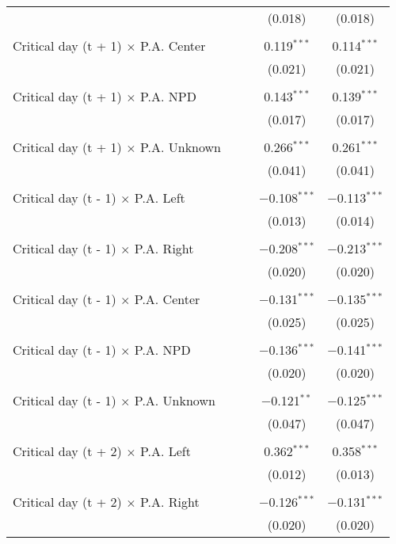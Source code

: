 \documentclass[
]{article}
\begin{document}
\begin{table}[!htbp]
{\begin{tabular}{@{\extracolsep{5pt}}lcccc}
  &  &  & (0.018) & (0.018) \\ 
  & & & & \\ 
 Critical day (t + 1) $\times$ P.A. Center &  &  & 0.119$^{***}$ & 0.114$^{***}$ \\ 
  &  &  & (0.021) & (0.021) \\ 
  & & & & \\ 
 Critical day (t + 1) $\times$ P.A. NPD &  &  & 0.143$^{***}$ & 0.139$^{***}$ \\ 
  &  &  & (0.017) & (0.017) \\ 
  & & & & \\ 
 Critical day (t + 1) $\times$ P.A. Unknown &  &  & 0.266$^{***}$ & 0.261$^{***}$ \\ 
  &  &  & (0.041) & (0.041) \\ 
  & & & & \\ 
 Critical day (t - 1) $\times$ P.A. Left &  &  & $-$0.108$^{***}$ & $-$0.113$^{***}$ \\ 
  &  &  & (0.013) & (0.014) \\ 
  & & & & \\ 
 Critical day (t - 1) $\times$ P.A. Right &  &  & $-$0.208$^{***}$ & $-$0.213$^{***}$ \\ 
  &  &  & (0.020) & (0.020) \\ 
  & & & & \\ 
 Critical day (t - 1) $\times$ P.A. Center &  &  & $-$0.131$^{***}$ & $-$0.135$^{***}$ \\ 
  &  &  & (0.025) & (0.025) \\ 
  & & & & \\ 
 Critical day (t - 1) $\times$ P.A. NPD &  &  & $-$0.136$^{***}$ & $-$0.141$^{***}$ \\ 
  &  &  & (0.020) & (0.020) \\ 
  & & & & \\ 
 Critical day (t - 1) $\times$ P.A. Unknown &  &  & $-$0.121$^{**}$ & $-$0.125$^{***}$ \\ 
  &  &  & (0.047) & (0.047) \\ 
  & & & & \\ 
 Critical day (t + 2) $\times$ P.A. Left &  &  & 0.362$^{***}$ & 0.358$^{***}$ \\ 
  &  &  & (0.012) & (0.013) \\ 
  & & & & \\ 
 Critical day (t + 2) $\times$ P.A. Right &  &  & $-$0.126$^{***}$ & $-$0.131$^{***}$ \\ 
  &  &  & (0.020) & (0.020) \\ 

\end{tabular}}
\end{table}
\end{document}

